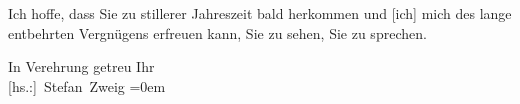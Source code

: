 \pstart
           Ich hoffe, dass Sie zu stillerer Jahreszeit bald herkommen und {[}ich{]} mich des lange
               entbehrten Vergnügens erfreuen kann, Sie zu sehen, Sie zu sprechen.\pend
           
\pstart
           In Verehrung getreu Ihr{\\[\baselineskip]}\spacefill\mbox{{[}hs.:{]} Stefan Zweig}\pend
           \leftskip=0em{}\endnumbering{}  \newcommand{\dateiname}{L03685}\newcommand{\titel}{Stefan Zweig an Arthur Schnitzler, 18. 8. 1920}\newcommand{\editorInnen}{Selma Jahnke und Martin Anton Müller}
